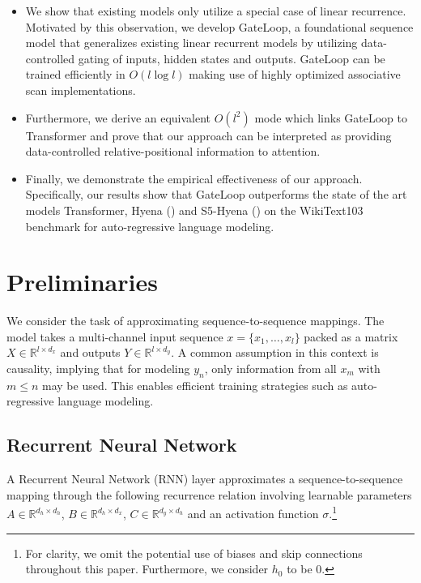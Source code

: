 \begin{itemize}[noitemsep, itemsep=0.2cm, topsep=0pt]
  \item We show that existing models only utilize a special case of linear recurrence. Motivated by this observation, we develop GateLoop, a foundational sequence model that generalizes existing linear recurrent models by utilizing data-controlled gating of inputs, hidden states and outputs. GateLoop can be trained efficiently in $O(l \log l)$ making use of highly optimized associative scan implementations. 
  \item Furthermore, we derive an equivalent $O(l^2)$ mode which links GateLoop to Transformer and prove that our approach can be interpreted as providing data-controlled relative-positional information to attention. 
  \item Finally, we demonstrate the empirical effectiveness of our approach. Specifically, our results show that GateLoop outperforms the state of the art models Transformer, Hyena (\cite{poli2023hyena}) and S5-Hyena (\cite{smith2023github}) on the WikiText103 benchmark for auto-regressive language modeling.
\end{itemize}

\section{Preliminaries}
We consider the task of approximating sequence-to-sequence mappings. The model takes a multi-channel input sequence \( x = \{ x_1, \ldots, x_l \} \) packed as a matrix \( X \in \mathbb{R}^{l \times d_{x}} \) and outputs \( Y \in \mathbb{R}^{l \times d_{y}} \). A common assumption in this context is causality, implying that for modeling \( y_n \), only information from all \( x_m \) with \( m \leq n \) may be used. This enables efficient training strategies such as auto-regressive language modeling. 

\subsection{Recurrent Neural Network} A Recurrent Neural Network (RNN) layer approximates a sequence-to-sequence mapping through the following recurrence relation involving learnable parameters $A \in \mathbb{R}^{d_h \times d_h}$, $B \in \mathbb{R}^{d_h \times d_x}$, $C \in \mathbb{R}^{d_y \times d_h}$ and an activation function $\sigma$.\footnote{For clarity, we omit the potential use of biases and skip connections throughout this paper. Furthermore, we consider $h_0$ to be 0.}

